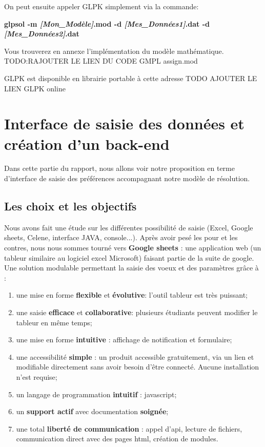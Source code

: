 \documentclass{polytech/polytech}
\begin{document}
On peut ensuite appeler GLPK simplement via la commande:
\begin{center}
\textbf{glpsol -m \textit{[Mon\_Modèle]}.mod -d \textit{[Mes\_Données1]}.dat -d \textit{[Mes\_Données2]}.dat}
\end{center}

Vous trouverez en annexe  l'implémentation du modèle mathématique. TODO:RAJOUTER LE LIEN DU CODE GMPL assign.mod

GLPK est disponible en librairie portable à cette adresse TODO AJOUTER LE LIEN GLPK online

\section{Interface de saisie des données et création d'un back-end}
Dans cette partie du rapport, nous allons voir notre proposition en terme d'interface de saisie des préférences accompagnant notre modèle de résolution.

\subsection{Les choix et les objectifs}
Nous avons fait une étude sur les différentes possibilité de saisie (Excel, Google sheets, Celene, interface JAVA, console...).
Après avoir pesé les pour et les contres, nous nous sommes tourné vers \textbf{Google sheets} : une application web (un tableur similaire au logiciel excel Microsoft) faisant partie de la suite de google.
Une solution modulable permettant la saisie des voeux et des paramètres grâce à :
\begin{enumerate}
\item une mise en forme \textbf{flexible} et \textbf{évolutive}: l'outil tableur est très puissant;
\item une saisie \textbf{efficace} et \textbf{collaborative}: plusieurs étudiants peuvent modifier le tableur en même temps;
\item une mise en forme \textbf{intuitive} : affichage de notification et formulaire;
\item une accessibilité \textbf{simple} : un produit accessible gratuitement, via un lien et modifiable directement sans avoir besoin d'être connecté. Aucune installation n’est requise;
\item un langage de programmation \textbf{intuitif} : javascript;
\item un \textbf{support actif} avec documentation \textbf{soignée};
\item une total \textbf{liberté de communication} : appel d’api, lecture de fichiers, communication direct avec des pages html, création de modules.
\end{enumerate}
\end{document}
